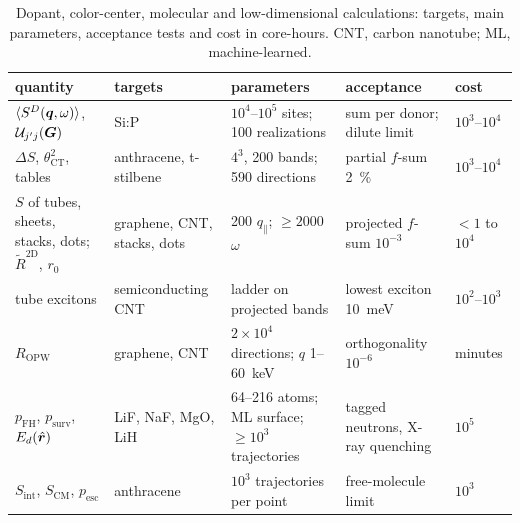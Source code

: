 \begin{table}[t]
  \centering
  \caption{Dopant, color-center, molecular and low-dimensional calculations: targets, main parameters, acceptance tests and cost in core-hours. CNT, carbon nanotube; ML, machine-learned.}
  \label{tab:E21-params}
  \small
  \setlength{\tabcolsep}{4pt}
  \begin{tabular}{p{}p{}p{}p{}p{}}
    \toprule
    quantity & targets & parameters & acceptance & cost \\
    \midrule
    $\langle S^D(\bm{q},\omega)\rangle$, $\mathcal{U}_{j'j}(\bm{G})$ & Si:P & $10^4$--$10^5$ sites; 100 realizations & sum per donor; dilute limit & $10^3$--$10^4$ \\
    $\Delta S$, $\theta^2_{\mathrm{CT}}$, tables & anthracene, t-stilbene & $4^3$, 200 bands; 590 directions & partial $f$-sum \SI{2}{\percent} & $10^3$--$10^4$ \\
    $S$ of tubes, sheets, stacks, dots; $\tilde R^{\mathrm{2D}}$, $r_0$ & graphene, CNT, stacks, dots & 200 $q_\parallel$; ${\ge}2000$ $\omega$ & projected $f$-sum $10^{-3}$ & ${<}1$ to $10^4$ \\
    tube excitons & semiconducting CNT & ladder on projected bands & lowest exciton \SI{10}{meV} & $10^2$--$10^3$ \\
    $R_{\mathrm{OPW}}$ & graphene, CNT & $2\times10^4$ directions; $q$ 1--\SI{60}{keV} & orthogonality $10^{-6}$ & minutes \\
    $p_{\mathrm{FH}}$, $p_{\mathrm{surv}}$, $E_d(\hat{\bm{r}})$ & LiF, NaF, MgO, LiH & 64--216 atoms; ML surface; ${\ge}10^3$ trajectories & tagged neutrons, X-ray quenching & $10^5$ \\
    $S_{\mathrm{int}}$, $S_{\mathrm{CM}}$, $p_{\mathrm{esc}}$ & anthracene & $10^3$ trajectories per point & free-molecule limit & $10^3$ \\
    \bottomrule
  \end{tabular}
\end{table}
